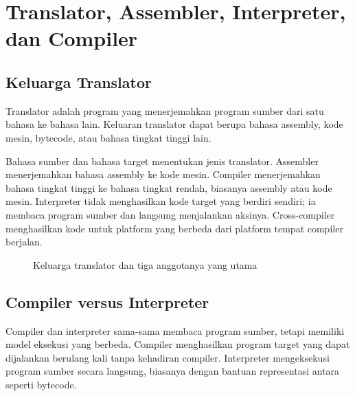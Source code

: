 \section{Translator, Assembler, Interpreter, dan Compiler}
\label{sec:ch03-translator}

\subsection{Keluarga Translator}

\begin{definisi}[Translator]
Translator adalah program yang menerjemahkan program sumber dari satu
bahasa ke bahasa lain. Keluaran translator dapat berupa bahasa
assembly, kode mesin, bytecode, atau bahasa tingkat tinggi lain.
\end{definisi}

Bahasa sumber dan bahasa target menentukan jenis translator. Assembler
menerjemahkan bahasa assembly ke kode mesin. Compiler menerjemahkan
bahasa tingkat tinggi ke bahasa tingkat rendah, biasanya assembly atau
kode mesin. Interpreter tidak menghasilkan kode target yang berdiri
sendiri; ia membaca program sumber dan langsung menjalankan aksinya.
Cross-compiler menghasilkan kode untuk platform yang berbeda dari
platform tempat compiler berjalan.

\begin{figure}[H]
\centering
{}
\caption{Keluarga translator dan tiga anggotanya yang utama}
\label{fig:ch03-translator}
\end{figure}

\subsection{Compiler versus Interpreter}

Compiler dan interpreter sama-sama membaca program sumber, tetapi
memiliki model eksekusi yang berbeda. Compiler menghasilkan program
target yang dapat dijalankan berulang kali tanpa kehadiran compiler.
Interpreter mengeksekusi program sumber secara langsung, biasanya
dengan bantuan representasi antara seperti bytecode.


